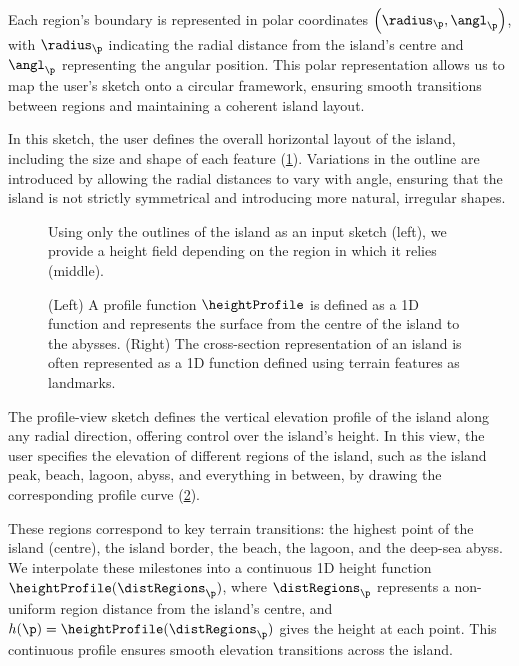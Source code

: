 Each region's boundary is represented in polar coordinates $\left(\radius_\p, \angl_\p\right)$, with $\radius_\p$ indicating the radial distance from the island's centre and $\angl_\p$ representing the angular position. This polar representation allows us to map the user's sketch onto a circular framework, ensuring smooth transitions between regions and maintaining a coherent island layout.

In this sketch, the user defines the overall horizontal layout of the island, including the size and shape of each feature (\cref{fig:coral-island-procedural-height-only}). Variations in the outline are introduced by allowing the radial distances to vary with angle, ensuring that the island is not strictly symmetrical and introducing more natural, irregular shapes.

\begin{figure}[H]
    \caption{Using only the outlines of the island as an input sketch (left), we provide a height field depending on the region in which it relies (middle).}
    \label{fig:coral-island-procedural-height-only}
\end{figure}

\begin{figure}
    \caption{(Left) A profile function $\heightProfile$ is defined as a 1D function and represents the surface from the centre of the island to the abysses. (Right) The cross-section representation of an island is often represented as a 1D function defined using terrain features as landmarks.}
    \label{fig:coral-island-profile-function}
\end{figure}

The profile-view sketch defines the vertical elevation profile of the island along any radial direction, offering control over the island's height. In this view, the user specifies the elevation of different regions of the island, such as the island peak, beach, lagoon, abyss, and everything in between, by drawing the corresponding profile curve (\cref{fig:coral-island-profile-function}).

These regions correspond to key terrain transitions: the highest point of the island (centre), the island border, the beach, the lagoon, and the deep-sea abyss. We interpolate these milestones into a continuous 1D height function $\heightProfile(\distRegions_\p)$, where $\distRegions_\p$ represents a non-uniform region distance from the island's centre, and $h(\p) = \heightProfile(\distRegions_\p)$ gives the height at each point. This continuous profile ensures smooth elevation transitions across the island.

